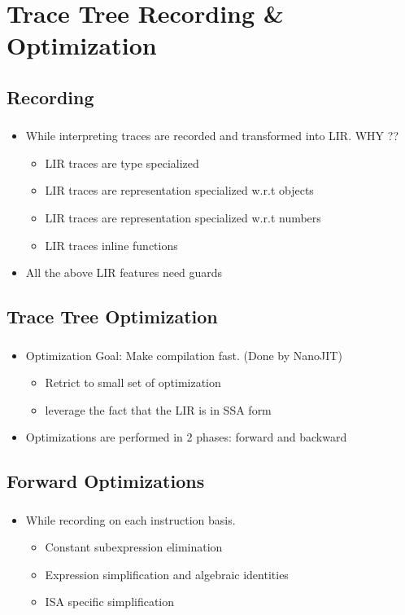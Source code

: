 \documentclass[mathserif,10pt]{beamer}
\begin{document}
\section{Trace Tree Recording \& Optimization}
\subsection{Recording}
\frame
{
  \frametitle{\subsecname}
  \begin{itemize}
    \item While interpreting traces are recorded and transformed into LIR. WHY ?? 
      \begin{itemize}
        \item LIR traces are type specialized
        \item LIR traces are representation specialized w.r.t objects
        \item LIR traces are representation specialized w.r.t numbers
        \item LIR traces inline functions
      \end{itemize}  
    \item All the above LIR features need guards
  \end{itemize}  
}

\subsection{Trace Tree Optimization}
\frame
{
  \frametitle{\subsecname}
  \begin{itemize}
    \item Optimization Goal: Make compilation fast. (Done by NanoJIT)
    \begin{itemize}
      \item Retrict to small set of optimization
      \item leverage the fact that the LIR is in SSA form 
    \end{itemize}
    \item Optimizations are performed in 2 phases: forward and backward 
  \end{itemize}     
}

\subsection{Forward Optimizations}
\frame
{
  \frametitle{\subsecname}
  \begin{itemize}
    \item While recording on each instruction basis.
      \begin{itemize}
        \item Constant subexpression elimination
        \item Expression simplification and algebraic identities
        \item ISA specific simplification
      \end{itemize}  
  \end{itemize}  
}
\end{document}
